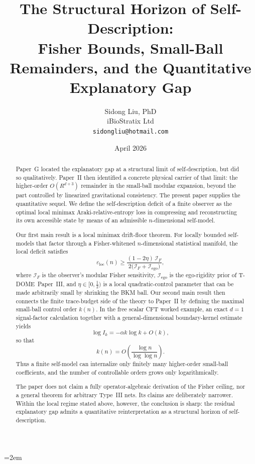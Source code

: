 \documentclass[12pt]{article}
\title{%
  \textbf{The Structural Horizon of Self-Description:}\\
  \textbf{Fisher Bounds, Small-Ball Remainders, and the Quantitative Explanatory Gap}%
}
\author{
  Sidong Liu, PhD \\
  \small iBioStratix Ltd \\
  \small \texttt{sidongliu@hotmail.com}
}
\date{April 2026}
\theoremstyle{definition}
\theoremstyle{remark}
\begin{document}
\emergencystretch=2em
\raggedbottom
{}

\maketitle

\begin{abstract}
%
Paper~G located the explanatory gap at a structural limit of
self-description, but did so qualitatively. Paper~II then identified a
concrete physical carrier of that limit: the higher-order
\(O(R^{d+3})\) remainder in the small-ball modular expansion, beyond
the part controlled by linearized gravitational consistency. The present
paper supplies the quantitative sequel. We define the self-description
deficit of a finite observer as the optimal local minimax
Araki-relative-entropy loss in compressing and reconstructing its own
accessible state by means of an admissible \(n\)-dimensional self-model.

Our first main result is a local minimax drift-floor theorem. For
locally bounded self-models that factor through a Fisher-whitened
\(n\)-dimensional statistical manifold, the local deficit satisfies
\[
\varepsilon_{\mathrm{loc}}(n)
\ge
\frac{(1-2\eta)\,\mathcal{I}_F}
{2\bigl(\mathcal{I}_F + \mathcal{I}_{\mathrm{ego}}\bigr)},
\]
where \(\mathcal{I}_F\) is the observer's modular Fisher sensitivity,
\(\mathcal{I}_{\mathrm{ego}}\) is the ego-rigidity prior of
T-DOME~Paper~III, and \(\eta\in[0,\tfrac{1}{2})\) is a local
quadratic-control parameter that can be made arbitrarily small by
shrinking the BKM ball. Our second main result then connects the finite
trace-budget side of the theory to Paper~II by defining the maximal
small-ball control order \(k(n)\). In the free scalar CFT worked
example, an exact \(d=1\) signal-factor calculation together with a
general-dimensional boundary-kernel estimate yields
\[
\log I_k = -\alpha k\log k + O(k),
\]
so that
\[
k(n)=O\!\left(\frac{\log n}{\log\log n}\right).
\]
Thus a finite self-model can internalize only finitely many higher-order
small-ball coefficients, and the number of controllable orders grows
only logarithmically.

The paper does not claim a fully operator-algebraic derivation of the
Fisher ceiling, nor a general theorem for arbitrary Type~III nets. Its
claims are deliberately narrower. Within the local regime stated above,
however, the conclusion is sharp: the residual explanatory gap admits a
quantitative reinterpretation as a structural horizon of
self-description.
 \end{abstract}
\end{document}
